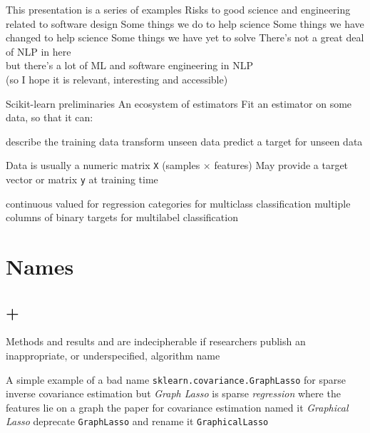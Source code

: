 \documentclass[aspectratio=169, 22pt]{beamer}
\newenvironment{sectionslide}
			{\subsection*{+}\begin{frame}[fragile,environment=sectionslide]\vfill\begin{center}\Large}
			{\end{center}\vfill\end{frame}}
\begin{document}

\begin{points}{This presentation is a series of examples}
	\p Risks to good science and engineering related to software design
	\vfill
	\p Some things we do to help science
	\p Some things we have changed to help science
	\p Some things we have yet to solve
	\vfill
	\p There's not a great deal of NLP in here \\
	but there's a lot of ML and software engineering in NLP\\
	(so I hope it is relevant, interesting and accessible)
\end{points}


\begin{points}{Scikit-learn preliminaries}
	\p An ecosystem of estimators
	\p Fit an estimator on some data, so that it can:
	\begin{itemize}
		\p describe the training data
		\p transform unseen data
		\p predict a target for unseen data
	\end{itemize}
	\p Data is usually a numeric matrix \verb|X| (samples $\times$ features)
	\p May provide a target vector or matrix \verb|y| at training time
	\begin{itemize}
		\p continuous valued for regression
		\p categories for multiclass classification
		\p multiple columns of binary targets for multilabel classification
	\end{itemize}
\end{points}


\section{Names}

\begin{sectionslide}
	Methods and results and are indecipherable if researchers publish an inappropriate, or underspecified, algorithm name
\end{sectionslide}


\begin{points}{A simple example of a bad name}
	\p \verb|sklearn.covariance.GraphLasso| for sparse inverse covariance estimation
	\p but \emph{Graph Lasso} is sparse \emph{regression} where the features lie on a graph
	\p the paper for covariance estimation named it \emph{Graphical Lasso}
	\pause
	\p[Solution] deprecate \verb|GraphLasso| and rename it \verb|GraphicalLasso|
\end{points}
\end{document}
